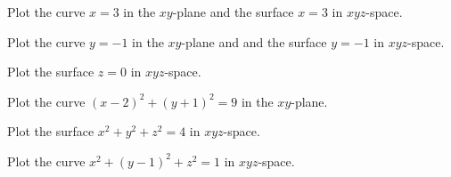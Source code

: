 \documentclass[letterpaper, twoside, 12pt]{book}
\begin{document}
          \begin{problem}
            Plot the curve $x=3$ in the $xy$-plane and the surface
            $x=3$ in $xyz$-space.
          \end{problem}

          \begin{solution}

          \end{solution}

          \begin{problem}
            Plot the curve $y=-1$ in the $xy$-plane and and the surface
            $y=-1$ in $xyz$-space.
          \end{problem}

          \begin{solution}

          \end{solution}

          \begin{problem}
            Plot the surface $z=0$ in $xyz$-space.
          \end{problem}

          \begin{solution}

          \end{solution}

          \begin{problem}
            Plot the curve $(x-2)^2+(y+1)^2=9$ in the $xy$-plane.
          \end{problem}

          \begin{solution}

          \end{solution}

          \begin{problem}
            Plot the surface $x^2+y^2+z^2=4$ in $xyz$-space.
          \end{problem}

          \begin{solution}

          \end{solution}

          \begin{problem}
            Plot the curve $x^2+(y-1)^2+z^2=1$ in $xyz$-space.
          \end{problem}

          \begin{solution}

          \end{solution}
\end{document}
